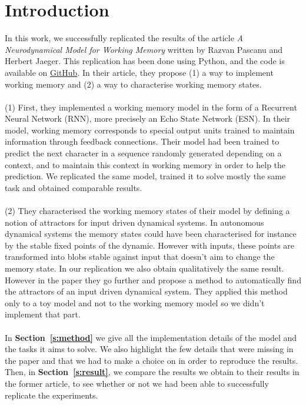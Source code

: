 
\section{Introduction}
\label{s:intro}

In this work, we successfully replicated the results of the article \textit{A Neurodynamical Model for Working Memory}\supercite{bib:NeurodynamicalModel} written by Razvan Pascanu and Herbert Jaeger.
This replication has been done using Python, and the code is available on \href{https://github.com/theoboraud/ESN}{GitHub}\supercite{bib:githubRepo}.
In their article, they propose (1) a way to implement working memory and (2) a way to characterise working memory states. \\
\\
(1) First, they implemented a working memory model in the form of a Recurrent Neural Network (RNN), more precisely an Echo State Network (ESN).
In their model, working memory corresponds to special output units trained to maintain information through feedback connections.
Their model had been trained to predict the next character in a sequence randomly generated depending on a context, and to maintain this context in working memory in order to help the prediction. We replicated the same model, trained it to solve mostly the same task and obtained comparable results. \\
\\
(2) They characterised the working memory states of their model by defining a notion of attractors for input driven dynamical systems.
In autonomous dynamical systems the memory states could have been characterised for instance by the stable fixed points of the dynamic.
However with inputs, these points are transformed into blobs stable against input that doesn't aim to change the memory state.
In our replication we also obtain qualitatively the same result.
However in the paper they go further and propose a method to automatically find the attractors of an input driven dynamical system.
They applied this method only to a toy model and not to the working memory model so we didn't implement that part. \\
\\
In \textbf{Section~\ref{s:method}} we give all the implementation details of the model and the tasks it aims to solve.
We also highlight the few details that were missing in the paper and that we had to make a choice on in order to reproduce the results.
Then, in \textbf{Section~\ref{s:result}}, we compare the results we obtain to their results in the former article, to see whether or not we had been able to successfully replicate the experiments.

